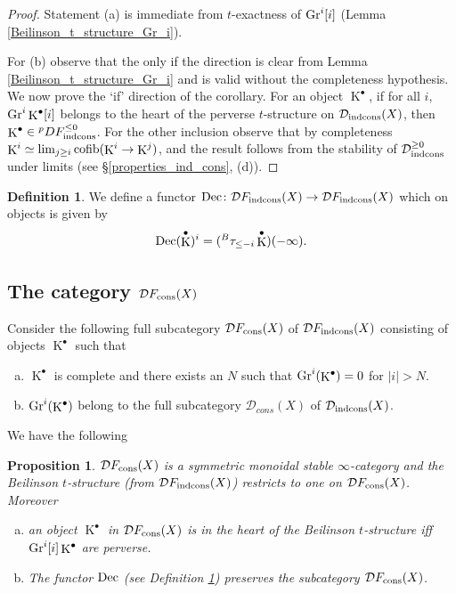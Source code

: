 \documentclass[12pt, reqno]{amsart}
\theoremstyle{plain}
\newtheorem{prop}[thm]{\bf Proposition}
\theoremstyle{definition}
\theoremstyle{definition}
\newtheorem{defn}[thm]{\bf Definition}
\newcommand{\cD}{{\mathcal D}}
\DeclareMathOperator{\KK}{K}
\begin{document}
\begin{proof}
Statement (a) is immediate from $t$-exactness of $\textup{Gr}^i[i]$ (Lemma \ref{Beilinson_t_structure_Gr_i}).

For (b) observe that the only if the direction is clear from Lemma \ref{Beilinson_t_structure_Gr_i} and is valid without the completeness hypothesis. We now prove the `if' direction of the corollary. For an object $\KK^{\bullet}$, if for all $i$, $\textup{Gr}^{i}\KK^{\bullet}[i]$ belongs to the heart of the perverse $t$-structure on $\cD_{\textup{indcons}}(X)$, then $\KK^{\bullet} \in{}^pD F^{\leq 0}_{\textup{indcons}}$. For the other inclusion observe that by completeness $\KK^i \simeq \lim_{j\geq i}\textup{cofib}(\KK^i \to \KK^j)$, and the result follows from the stability of $\cD^{\geq 0}_{\textup{indcons}}$ under limits (see \S \ref{properties_ind_cons}, (d)). 
\end{proof}

\begin{defn}\label{decalage}
 We define a functor $\textup{Dec} \colon \cD F_{\textup{indcons}}(X) \to \cD F_{\textup{indcons}}(X)$ which on objects is given by 
\begin{equation}\label{def_Dec}
\textup{Dec}(\KK^{\bullet})^{i} = ({}^B\tau_{\leq -i}\KK^{\bullet})(-\infty).
\end{equation}   
\end{defn} 



\subsection{The category $\cD F_{\textup{cons}}(X)$}\label{cDF_cons}
Consider the following full subcategory $\cD F_{\textup{cons}}(X)$ of $\cD F_{\textup{indcons}}(X)$ consisting of objects $\KK^{\bullet}$ such that
\begin{enumerate}[(a)]
    \item $\KK^{\bullet}$ is complete and there exists an $N$ such that $\textup{Gr}^{i}(\KK^{\bullet})=0$ for $|i|>N$.
    \item $\textup{Gr}^{i}(\KK^{\bullet})$ belong to the full subcategory $\cD_{cons}(X)$ of $\cD_{\textup{indcons}}(X)$.
\end{enumerate}

We have the following

\begin{prop}\label{t_strtucture_DF_cons}
    $\cD F_{\textup{cons}}(X)$ is a symmetric monoidal stable $\infty$-category and the Beilinson $t$-structure (from $\cD F_{\textup{indcons}}(X)$) restricts to one on $\cD F_{\textup{cons}}(X)$. Moreover
    \begin{enumerate}[(a)]
        \item an object $\KK^{\bullet}$ in  $\cD F_{\textup{cons}}(X)$ is in the heart of the Beilinson $t$-structure iff $\textup{Gr}^{i}[i]\KK^{\bullet}$ are perverse.
        \item The functor $\textup{Dec}$ (see Definition \ref{decalage}) preserves the subcategory $\cD F_{\textup{cons}}(X)$. 
    \end{enumerate}
\end{prop}
\end{document}
